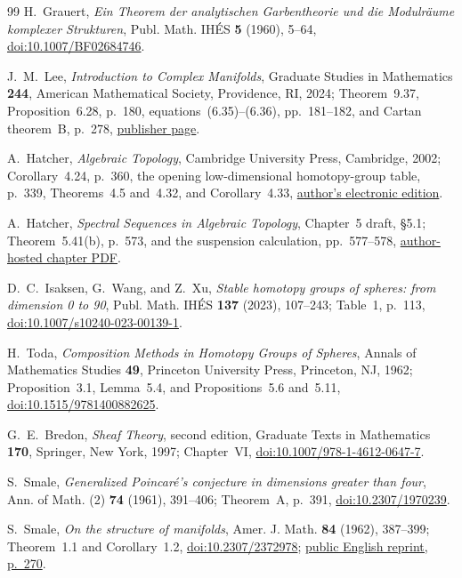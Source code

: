 \begin{thebibliography}{99}
H.~Grauert, \emph{Ein Theorem der analytischen Garbentheorie und die
Modulr\"aume komplexer Strukturen}, Publ. Math. IH\'ES \textbf{5} (1960),
5--64, \href{https://doi.org/10.1007/BF02684746}{doi:10.1007/BF02684746}.

J.~M.~Lee,
\emph{Introduction to Complex Manifolds},
Graduate Studies in Mathematics \textbf{244}, American Mathematical Society,
Providence, RI, 2024; Theorem~9.37,
Proposition~6.28, p.~180, equations~(6.35)--(6.36), pp.~181--182,
and Cartan theorem~B, p.~278,
\href{https://bookstore.ams.org/gsm-244}{publisher page}.

A.~Hatcher,
\emph{Algebraic Topology},
Cambridge University Press, Cambridge, 2002; Corollary~4.24, p.~360,
the opening low-dimensional homotopy-group table, p.~339,
Theorems~4.5 and~4.32, and Corollary~4.33,
\href{https://pi.math.cornell.edu/~hatcher/AT/ATpage.html}{author's electronic edition}.

A.~Hatcher,
\emph{Spectral Sequences in Algebraic Topology}, Chapter~5 draft,
\S5.1; Theorem~5.41(b), p.~573, and the suspension calculation,
pp.~577--578,
\href{https://pi.math.cornell.edu/~hatcher/AT/ATch5.pdf}%
{author-hosted chapter PDF}.

D.~C.~Isaksen, G.~Wang, and Z.~Xu,
\emph{Stable homotopy groups of spheres: from dimension 0 to 90},
Publ. Math. IH\'ES \textbf{137} (2023), 107--243; Table~1, p.~113,
\href{https://doi.org/10.1007/s10240-023-00139-1}%
{doi:10.1007/s10240-023-00139-1}.

H.~Toda,
\emph{Composition Methods in Homotopy Groups of Spheres},
Annals of Mathematics Studies \textbf{49}, Princeton University Press,
Princeton, NJ, 1962; Proposition~3.1, Lemma~5.4, and
Propositions~5.6 and~5.11,
\href{https://doi.org/10.1515/9781400882625}%
{doi:10.1515/9781400882625}.

G.~E.~Bredon,
\emph{Sheaf Theory}, second edition,
Graduate Texts in Mathematics \textbf{170}, Springer, New York, 1997;
Chapter~VI,
\href{https://doi.org/10.1007/978-1-4612-0647-7}{doi:10.1007/978-1-4612-0647-7}.

S.~Smale,
\emph{Generalized Poincar\'e's conjecture in dimensions greater than four},
Ann. of Math. (2) \textbf{74} (1961), 391--406; Theorem~A, p.~391,
\href{https://doi.org/10.2307/1970239}{doi:10.2307/1970239}.

S.~Smale,
\emph{On the structure of manifolds},
Amer. J. Math. \textbf{84} (1962), 387--399;
Theorem~1.1 and Corollary~1.2,
\href{https://doi.org/10.2307/2372978}{doi:10.2307/2372978};
\href{https://www.sas.rochester.edu/mth/sites/doug-ravenel/otherpapers/Novikov-Cobordism.pdf}%
{public English reprint, p.~270}.


\end{thebibliography}
